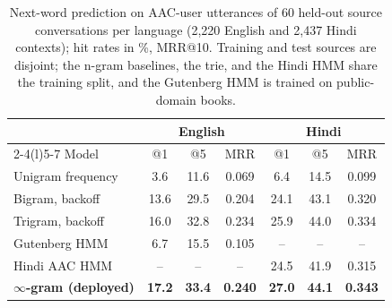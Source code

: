 \begin{table}[t]
\centering\footnotesize
\setlength{\tabcolsep}{3pt}
\begin{tabular}{@{}lcccccc@{}}
\toprule
 & \multicolumn{3}{c}{English} & \multicolumn{3}{c}{Hindi} \\
\cmidrule(lr){2-4}\cmidrule(l){5-7}
Model & @1 & @5 & MRR & @1 & @5 & MRR \\
\midrule
Unigram frequency & 3.6 & 11.6 & 0.069 & 6.4 & 14.5 & 0.099 \\
Bigram, backoff & 13.6 & 29.5 & 0.204 & 24.1 & 43.1 & 0.320 \\
Trigram, backoff & 16.0 & 32.8 & 0.234 & 25.9 & 44.0 & 0.334 \\
Gutenberg HMM & 6.7 & 15.5 & 0.105 & -- & -- & -- \\
Hindi AAC HMM & -- & -- & -- & 24.5 & 41.9 & 0.315 \\
\midrule
\textbf{$\infty$-gram (deployed)} & \textbf{17.2} & \textbf{33.4} & \textbf{0.240} & \textbf{27.0} & \textbf{44.1} & \textbf{0.343} \\
\bottomrule
\end{tabular}
\caption{Next-word prediction on AAC-user utterances of 60 held-out source conversations per language (2,220 English and 2,437 Hindi contexts); hit rates in \%, MRR@10. Training and test sources are disjoint; the n-gram baselines, the trie, and the Hindi HMM share the training split, and the Gutenberg HMM is trained on public-domain books.}
\label{tab:pred}
\end{table}
